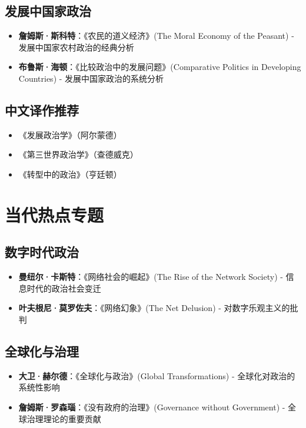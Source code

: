 \subsection{发展中国家政治}
\begin{itemize}
    \item \textbf{詹姆斯·斯科特}：《农民的道义经济》(The Moral Economy of the Peasant)
    \quad - 发展中国家农村政治的经典分析
    \item \textbf{布鲁斯·海顿}：《比较政治中的发展问题》(Comparative Politics in Developing Countries)
    \quad - 发展中国家政治的系统分析
\end{itemize}

\subsection{中文译作推荐}
\begin{itemize}
    \item 《发展政治学》（阿尔蒙德）
    \item 《第三世界政治学》（查德威克）
    \item 《转型中的政治》（亨廷顿）
\end{itemize}

\section{当代热点专题}

\subsection{数字时代政治}
\begin{itemize}
    \item \textbf{曼纽尔·卡斯特}：《网络社会的崛起》(The Rise of the Network Society)
    \quad - 信息时代的政治社会变迁
    \item \textbf{叶夫根尼·莫罗佐夫}：《网络幻象》(The Net Delusion)
    \quad - 对数字乐观主义的批判
\end{itemize}

\subsection{全球化与治理}
\begin{itemize}
    \item \textbf{大卫·赫尔德}：《全球化与政治》(Global Transformations)
    \quad - 全球化对政治的系统性影响
    \item \textbf{詹姆斯·罗森瑙}：《没有政府的治理》(Governance without Government)
    \quad - 全球治理理论的重要贡献
\end{itemize}

